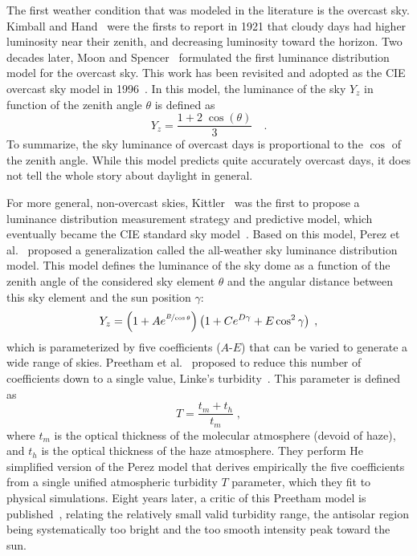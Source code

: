 The first weather condition that was modeled in the literature is the overcast sky. Kimball and Hand~\cite{kimball1921sky} were the firsts to report in 1921 that cloudy days had higher luminosity near their zenith, and decreasing luminosity toward the horizon. Two decades later, Moon and Spencer~\cite{moon1942illumination} formulated the first luminance distribution model for the overcast sky. This work has been revisited and adopted as the CIE overcast sky model in 1996~\cite{cie1996s}. In this model, the luminance of the sky $Y_z$ in function of the zenith angle $\theta$ is defined as
\begin{equation}
Y_z = \frac{1 + 2 \; \cos\left( \theta \right)}{3} \quad.
\end{equation}
To summarize, the sky luminance of overcast days is proportional to the $\cos$ of the zenith angle. While this model predicts quite accurately overcast days, it does not tell the whole story about daylight in general.


For more general, non-overcast skies, Kittler~\cite{kittler1985luminance} was the first to propose a luminance distribution measurement strategy and predictive model, which eventually became the CIE standard sky model~\cite{darula-cie-sky}. Based on this model, Perez et al.~\cite{perez1993allweather} proposed a generalization called the all-weather sky luminance distribution model. This model defines the luminance of the sky dome as a function of the zenith angle of the considered sky element $\theta$ and the angular distance between this sky element and the sun position $\gamma$:
\begin{equation}
Y_z = \left( 1 + A e^{\nicefrac{B}{\cos\theta}} \right)\left( 1 + C e^{D\gamma} + E \cos^2 \gamma \right) \;,
\end{equation}
which is parameterized by five coefficients ($A$-$E$) that can be varied to generate a wide range of skies. Preetham et al.~\cite{preetham-siggraph-99} proposed to reduce this number of coefficients down to a single value, Linke's turbidity~\cite{mccartney1976optics}. This parameter is defined as
\begin{equation}
T = \frac{t_m + t_h}{t_m} \;,
\end{equation}
where $t_m$ is the optical thickness of the molecular atmosphere (devoid of haze), and $t_h$ is the optical thickness of the haze atmosphere. They perform 
He simplified version of the Perez model that derives empirically the five coefficients from a single unified atmospheric turbidity $T$ parameter, which they fit to physical simulations. Eight years later, a critic of this Preetham model is published~\cite{zotti2007critical}, relating the relatively small valid turbidity range, the antisolar region being systematically too bright and the too smooth intensity peak toward the sun.

